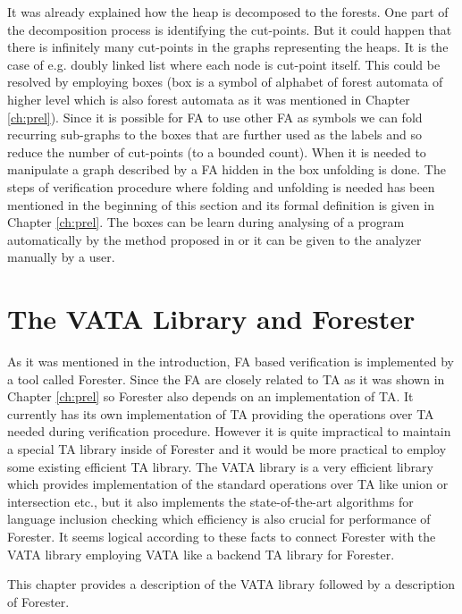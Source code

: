It was already explained how the heap is decomposed to the forests.
One part of the decomposition process is identifying the cut-points.
But it could happen that there is infinitely many cut-points in the graphs representing the heaps.
It is the case of e.g. doubly linked list where each node is cut-point itself.
This could be resolved by employing boxes (box is a symbol of alphabet of forest automata of higher level which is also forest automata as it was mentioned in Chapter \ref{ch:prel}).
Since it is possible for FA to use other FA as symbols we can fold recurring sub-graphs to the boxes that are further used as the labels
and so reduce the number of cut-points (to a bounded count).
When it is needed to manipulate a graph described by a FA hidden in the box unfolding is done.
The steps of verification procedure where folding and unfolding is needed has been mentioned in the beginning of this section
and its formal definition is given in Chapter \ref{ch:prel}.
The boxes can be learn during analysing of a program automatically by the method proposed in \cite{forester13} or
it can be given to the analyzer manually by a user.

\chapter{The VATA Library and Forester}
\label{ch:tools}

As it was mentioned in the introduction, FA based verification is implemented by a tool
called Forester.
Since the FA are closely related to TA as it was shown in Chapter \ref{ch:prel} so
Forester also depends on an implementation of TA.
It currently has its own implementation of TA providing the operations over TA needed during verification procedure.
However it is quite impractical to maintain a special TA library inside of Forester
and it would be more practical to employ some existing efficient TA library.
The VATA library is a very efficient library which provides implementation of the standard operations over TA like union or intersection etc.,
but it also implements the state-of-the-art algorithms \cite{tacas10} for language inclusion checking which efficiency
is also crucial for performance of Forester.
It seems logical according to these facts to connect Forester with the VATA library employing VATA like a backend TA library for Forester.

This chapter provides a description of the VATA library followed by a description of Forester.

\section{\Vata}
\label{sec:VATA}

